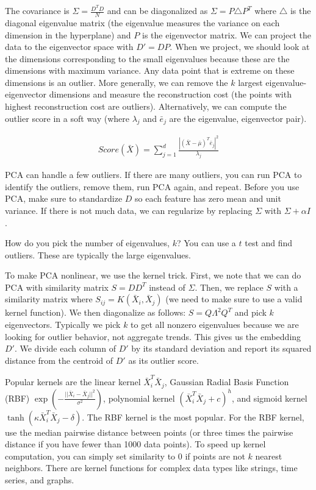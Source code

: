 \documentclass[a4paper]{article}
\begin{document}
The covariance is $\Sigma = \frac{D^T D}{N}$ and can be diagonalized as
$\Sigma = P \triangle P^T$ where $\triangle$ is the diagonal eigenvalue matrix
(the eigenvalue measures the variance on each dimension in the hyperplane)
and $P$ is the eigenvector matrix. We can project the data to the eigenvector
space with $D' = DP$. When we project, we should look at the dimensions
corresponding to the small eigenvalues because these are the dimensions with
maximum variance. Any data point that is extreme on these dimensions is an
outlier. More generally, we can remove the $k$ largest eigenvalue-eigenvector
dimensions and measure the reconstruction cost (the points with highest
reconstruction cost are outliers). Alternatively, we can compute the outlier
score in a soft way (where $\lambda_j$ and $\bar{e}_j$ are the eigenvalue,
eigenvector pair).

\begin{align}
  Score(\bar{X}) = \sum_{j=1}^{d}{\frac{|(\bar{X} - \bar{\mu})^T \bar{e}_j|^2}{
  \lambda_j}}
\end{align}

PCA can handle a few outliers. If there are many outliers, you can run PCA to
identify the outliers, remove them, run PCA again, and repeat. Before you
use PCA, make sure to standardize $D$ so each feature has zero mean and unit
variance. If there is not much data, we can regularize by replacing $\Sigma$
with $\Sigma + \alpha I$.

How do you pick the number of eigenvalues, $k$? You can use a $t$ test and
find outliers. These are typically the large eigenvalues.

To make PCA nonlinear, we use the kernel trick. First, we note that we can
do PCA with similarity matrix $S = D D^T$ instead of $\Sigma$. Then, we
replace $S$ with a similarity matrix where $S_{ij} =
K(\bar{X}_i, \bar{X}_j)$ (we need to make sure to use a valid kernel function).
We then diagonalize as follows: $S = Q \Lambda^2 Q^T$ and pick $k$
eigenvectors. Typically we pick $k$ to get all nonzero eigenvalues because we
are looking for outlier behavior, not aggregate trends. This gives us the
embedding $D'$. We divide each column of $D'$ by its standard deviation and
report its squared distance from the centroid of $D'$ as its outlier score.

Popular kernels are the linear kernel $\bar{X}_i^T \bar{X}_j$,
Gaussian Radial Basis Function (RBF)
$\exp{(-\frac{||\bar{X}_i - \bar{X}_j||^2}{\sigma^2})}$, polynomial kernel
$(\bar{X}_i^T \bar{X}_j + c)^h$, and sigmoid kernel $\tanh{(\kappa \bar{X}_i^T
\bar{X}_j - \delta)}$. The RBF kernel is the most popular. For the RBF kernel,
use the median pairwise distance between points (or three times the pairwise
distance if you have fewer than 1000 data points). To speed up kernel
computation, you can simply set similarity to 0 if points are not $k$
nearest neighbors. There are kernel functions for complex data types like
strings, time series, and graphs.
\end{document}
